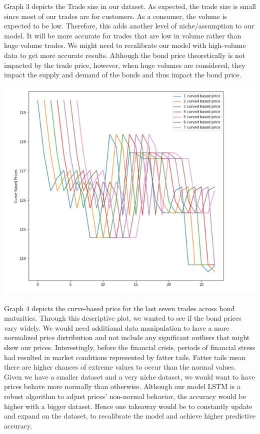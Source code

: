 \documentclass[
  man]{apa6}
\begin{document}
Graph 3 depicts the Trade size in our dataset. As expected, the trade size is small since most of our trades are for customers. As a consumer, the volume is expected to be low. Therefore, this adds another level of niche/assumption to our model. It will be more accurate for trades that are low in volume rather than huge volume trades. We might need to recalibrate our model with high-volume data to get more accurate results. Although the bond price theoretically is not impacted by the trade price, however, when huge volumes are considered, they impact the supply and demand of the bonds and thus impact the bond price.

\par

\includegraphics{graph4.png}

Graph 4 depicts the curve-based price for the last seven trades across bond maturities. Through this descriptive plot, we wanted to see if the bond prices vary widely. We would need additional data manipulation to have a more normalized price distribution and not include any significant outliers that might skew our prices. Interestingly, before the financial crisis, periods of financial stress had resulted in market conditions represented by fatter tails. Fatter tails mean there are higher chances of extreme values to occur than the normal values. Given we have a smaller dataset and a very niche dataset, we would want to have prices behave more normally than otherwise. Although our model LSTM is a robust algorithm to adjust prices' non-normal behavior, the accuracy would be higher with a bigger dataset. Hence one takeaway would be to constantly update and expand on the dataset, to recalibrate the model and achieve higher predictive accuracy.
\end{document}
